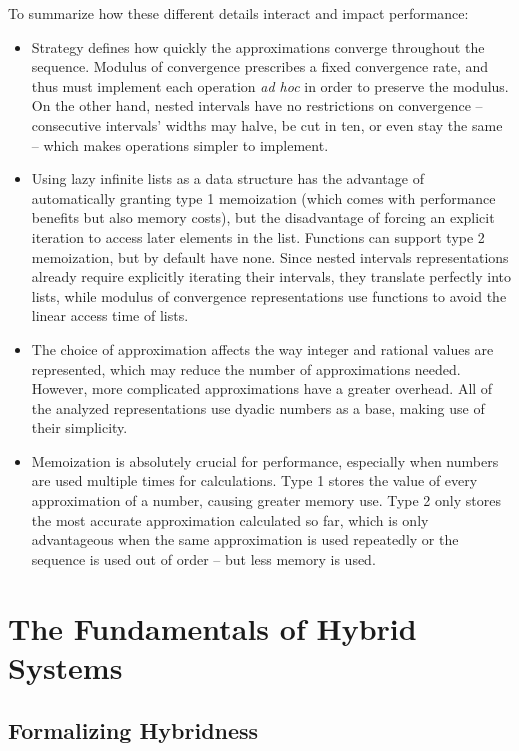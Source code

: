 To summarize how these different details interact and impact performance:
\begin{itemize}
  
  \item Strategy defines how quickly the approximations converge throughout the sequence. Modulus of convergence prescribes a fixed convergence rate, and thus must implement each operation \textit{ad hoc} in order to preserve the modulus. On the other hand, nested intervals have no restrictions on convergence -- consecutive intervals' widths may halve, be cut in ten, or even stay the same -- which makes operations simpler to implement.
  \item Using lazy infinite lists as a data structure has the advantage of automatically granting type 1 memoization (which comes with performance benefits but also memory costs), but the disadvantage of forcing an explicit iteration to access later elements in the list. Functions can support type 2 memoization, but by default have none. Since nested intervals representations already require explicitly iterating their intervals, they translate perfectly into lists, while modulus of convergence representations use functions to avoid the linear access time of lists.
  \item The choice of approximation affects the way integer and rational values are represented, which may reduce the number of approximations needed. However, more complicated approximations have a greater overhead. All of the analyzed representations use dyadic numbers as a base, making use of their simplicity.
  \item Memoization is absolutely crucial for performance, especially when numbers are used multiple times for calculations. Type 1 stores the value of every approximation of a number, causing greater memory use. Type 2 only stores the most accurate approximation calculated so far, which is only advantageous when the same approximation is used repeatedly or the sequence is used out of order -- but less memory is used.
\end{itemize}


\section{The Fundamentals of Hybrid Systems}
\label{sec:hybrid}

\subsection{Formalizing Hybridness}

